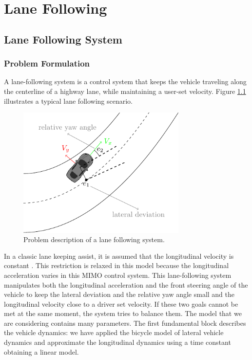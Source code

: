 \chapter{Lane Following}
\section{Lane Following System}
\subsection{Problem Formulation}
A lane-following system is a control system that keeps the vehicle traveling along the centerline of a highway lane, while maintaining a user-set velocity. Figure \ref{fig:laneFollowing} illustrates a typical lane following scenario.
\begin{figure}[!h]
	\centering
	\includegraphics[width=0.75\textwidth]{../figure/laneFollowing/laneFollowing.pdf}
	\caption{Problem description of a lane following system.}
	\label{fig:laneFollowing}
\end{figure}
In a classic lane keeping assist, it is assumed that the longitudinal velocity is constant \cite{borelli3}. This restriction is relaxed in this model because the longitudinal acceleration varies in this MIMO control system. This lane-following system manipulates both the longitudinal acceleration and the front steering angle of the vehicle to keep the lateral deviation and the relative yaw angle small and the longitudinal velocity close to a driver set velocity. If these two goals cannot be met at the same moment, the system tries to balance them. The model that we are considering contains many parameters. The first fundamental block describes the vehicle dynamics: we have applied the bicycle model of lateral vehicle dynamics and approximate the longitudinal dynamics using a time constant obtaining  a linear model.
